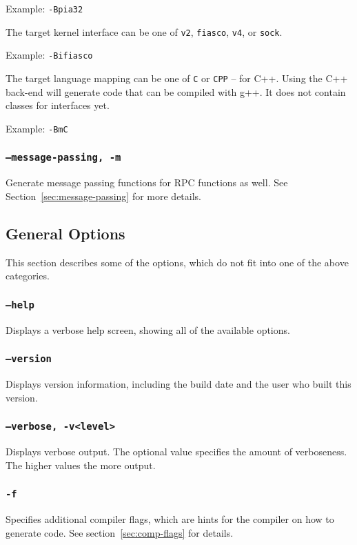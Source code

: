 Example: \verb|-Bpia32|

The target kernel interface can be one of {\tt v2}, {\tt fiasco},
{\tt v4}, or {\tt sock}.

Example: \verb|-Bifiasco|

The target language mapping can be one of {\tt C} or {\tt CPP} -- for C++.
Using the C++ back-end will generate code that can be compiled with g++. It
does not contain classes for interfaces yet.

Example: \verb|-BmC|

\subsubsection{{\tt --message-passing, -m}}
Generate message passing functions for RPC functions as well.
See Section~\ref{sec:message-passing} for more details.

\subsection{General Options}
This section describes some of the options, which do not fit into one
of the above categories.

\subsubsection{{\tt --help}}
Displays a verbose help screen, showing all of the available
options.

\subsubsection{{\tt --version}}
Displays version information, including the build date and the
user who built this version.

\subsubsection{{\tt --verbose, -v<level>}}
Displays verbose output.  The optional value specifies the amount of
verboseness. The higher values the more output.

\subsubsection{{\tt -f}}
Specifies additional compiler flags, which are hints for the compiler
on how to generate code. See section~\ref{sec:comp-flags} for details.

